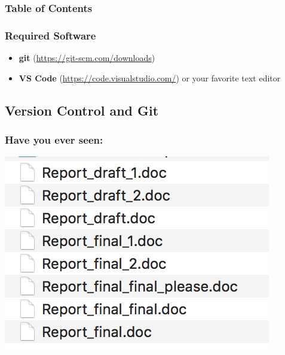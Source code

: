 \documentclass[12pt]{beamer}
\begin{document}
\begin{frame}
\frametitle{Table of Contents}
\tableofcontents
\end{frame}

\begin{frame}
\frametitle{Required Software}
\begin{itemize}
	\item \textbf{git} (\url{https://git-scm.com/downloads})
	\item \textbf{VS Code} (\url{https://code.visualstudio.com/}) or your favorite text editor
\end{itemize}
\end{frame}


\subsection{Version Control and Git}
\begin{frame}
\frametitle{Have you ever seen:}
\begin{center}	
	\includegraphics[width=0.5\linewidth]{bad_example}
\end{center}
\end{frame}
\end{document}

